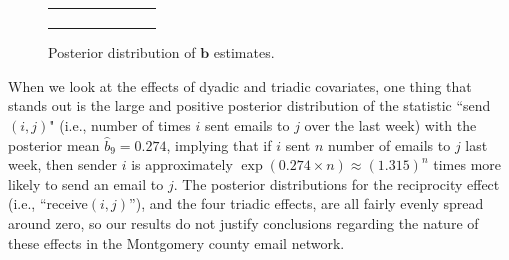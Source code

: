\documentclass[ba]{imsart}
\numberwithin{equation}{section}
\theoremstyle{plain}
\begin{document}
\begin{figure}[!t]
\begin{tabular}[t]{cc}
\begin{subfigure}[b]{0.4975\textwidth}
						\label{subfigure:betaresults2}	
					\end{subfigure}
				\end{tabular}
				\caption {Posterior distribution of $\boldsymbol{b}$ estimates.}
				\label{figure:betaresults}
			\end{figure}
		
	When we look at the effects of dyadic and triadic covariates, one thing that stands out is the large and positive posterior distribution of the statistic ``send$(i,j)$" (i.e., number of times $i$ sent emails to $j$ over the last week) with the posterior mean $\hat{b}_9 = 0.274$, implying that if $i$ sent $n$ number of emails to $j$ last week, then sender $i$ is approximately $\exp(0.274\times n)\approx(1.315)^n$ times more likely to send an email to $j$. The posterior distributions for the reciprocity effect (i.e., ``receive$(i, j)$''), and the four triadic effects, are all fairly evenly spread around zero, so our results do not justify conclusions regarding the nature of these effects in the Montgomery county email network.
\end{document}
